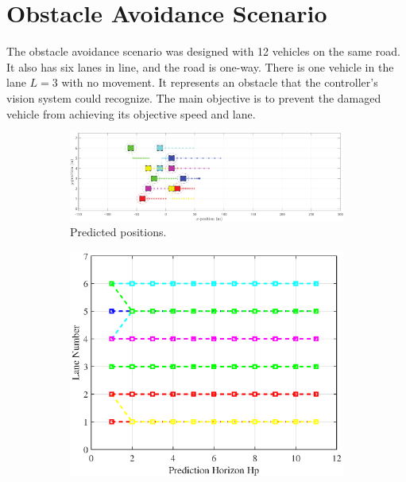 \newpage
\section{Obstacle Avoidance Scenario}

The obstacle avoidance scenario was designed with 12 vehicles on the same road. It also has six lanes in line, and the road is one-way. There is one vehicle in the lane $L=3$  with no movement. It represents an obstacle that the controller's vision system could recognize. The main objective is to prevent the damaged vehicle from achieving its objective speed and lane.

\begin{figure}[H]
\centering
\begin{subfigure}[t]{\textwidth}
    \includegraphics[width=\textwidth]{Kap6/obs_avoid/obs_avoid_traj0.eps}
    \caption{Predicted positions.}
    \label{fig:first}
\end{subfigure}
\vspace{1cm}
\begin{subfigure}[b]{0.45\textwidth}
    \includegraphics[width=\textwidth]{Kap6/obs_avoid/obs_avoid_lane0.eps}

\end{subfigure}
\end{figure}
